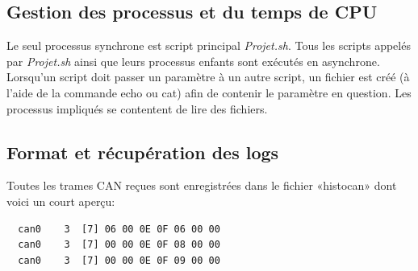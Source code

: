 \documentclass[10pt,a4paper,final]{article}
\begin{document}
\begin{spacing}{1.5}
\subsection{Gestion des processus et du temps de CPU}
Le seul processus synchrone est script principal \textit{Projet.sh}. Tous les scripts appelés par \textit{Projet.sh} ainsi que leurs processus enfants sont exécutés en asynchrone. Lorsqu'un script doit passer un paramètre à un autre script, un fichier est créé (à l'aide de la commande echo ou cat) afin de contenir le paramètre en question. Les processus impliqués se contentent de lire des fichiers.

\subsection{Format et récupération des logs}
Toutes les trames CAN reçues sont enregistrées dans le fichier «histocan» dont voici un court aperçu:
\end{spacing}

\begin{verbatim}
  can0    3  [7] 06 00 0E 0F 06 00 00
  can0    3  [7] 00 00 0E 0F 08 00 00
  can0    3  [7] 00 00 0E 0F 09 00 00
\end{verbatim}
\end{document}
